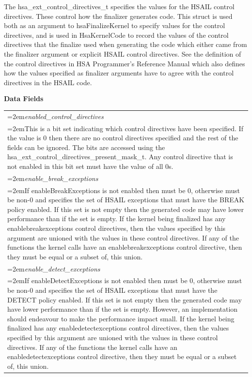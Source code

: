 \documentclass[final]{book}
\newcommand{\reffld}[1]{\textit{#1}}
\begin{document}
\vspace{-2mm}The hsa_\-ext_\-control_\-directives_\-t specifies the values for the HSAIL control directives. These control how the finalizer generates code. This struct is used both as an argument to hsaFinalizeKernel to specify values for the control directives, and is used in HsaKernelCode to record the values of the control directives that the finalize used when generating the code which either came from the finalizer argument or explicit HSAIL control directives. See the definition of the control directives in HSA Programmer's Reference Manual which also defines how the values specified as finalizer arguments have to agree with the control directives in the HSAIL code.

\noindent\textbf{Data Fields}\\[-6mm]
\begin{longtable}{@{}>{\hangindent=2em}p{\textwidth}}
\reffld{enabled_\-control_\-directives}\\\hspace{2em}This is a bit set indicating which control directives have been specified. If the value is 0 then there are no control directives specified and the rest of the fields can be ignored. The bits are accessed using the hsa_\-ext_\-control_\-directives_\-present_\-mask_\-t. Any control directive that is not enabled in this bit set must have the value of all 0s.\\[2mm]
\reffld{enable_\-break_\-exceptions}\\\hspace{2em}If enableBreakExceptions is not enabled then must be 0, otherwise must be non-0 and specifies the set of HSAIL exceptions that must have the BREAK policy enabled. If this set is not empty then the generated code may have lower performance than if the set is empty. If the kernel being finalized has any enablebreakexceptions control directives, then the values specified by this argument are unioned with the values in these control directives. If any of the functions the kernel calls have an enablebreakexceptions control directive, then they must be equal or a subset of, this union.\\[2mm]
\reffld{enable_\-detect_\-exceptions}\\\hspace{2em}If enableDetectExceptions is not enabled then must be 0, otherwise must be non-0 and specifies the set of HSAIL exceptions that must have the DETECT policy enabled. If this set is not empty then the generated code may have lower performance than if the set is empty. However, an implementation should endeavour to make the performance impact small. If the kernel being finalized has any enabledetectexceptions control directives, then the values specified by this argument are unioned with the values in these control directives. If any of the functions the kernel calls have an enabledetectexceptions control directive, then they must be equal or a subset of, this union.\\[2mm]

\end{longtable}
\end{document}
